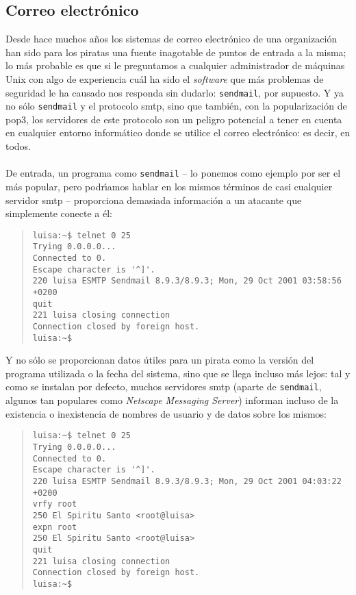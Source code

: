 \subsection{Correo electr\'onico}
Desde hace muchos a\~nos los sistemas de correo electr\'onico de una 
organizaci\'on han sido para los piratas una fuente inagotable de puntos de 
entrada a la misma; lo m\'as probable es que si le preguntamos a cualquier 
administrador de m\'aquinas Unix con algo de experiencia cu\'al ha sido el {\it 
software} que m\'as problemas de seguridad le ha causado nos responda sin 
dudarlo: {\tt sendmail}, por supuesto. Y ya no s\'olo {\tt sendmail} y el 
protocolo {\sc smtp}, sino que tambi\'en, con la popularizaci\'on de {\sc 
pop3}, los servidores de este protocolo son un peligro potencial a tener en
cuenta en cualquier entorno inform\'atico donde se utilice el correo 
electr\'onico: es decir, en todos.\\
\\De entrada, un programa como {\tt sendmail} -- lo ponemos como ejemplo por 
ser el m\'as popular, pero podr\'{\i}amos hablar en los mismos t\'erminos de
casi cualquier servidor {\sc smtp} -- proporciona demasiada informaci\'on a un
atacante que simplemente conecte a \'el:
\begin{quote}
\begin{verbatim}
luisa:~$ telnet 0 25
Trying 0.0.0.0...
Connected to 0.
Escape character is '^]'.
220 luisa ESMTP Sendmail 8.9.3/8.9.3; Mon, 29 Oct 2001 03:58:56 +0200
quit
221 luisa closing connection
Connection closed by foreign host.
luisa:~$ 
\end{verbatim}
\end{quote}
Y no s\'olo se proporcionan datos \'utiles para un pirata como la versi\'on del 
programa utilizada o la fecha del sistema, sino que se llega incluso m\'as 
lejos: tal y como se instalan por defecto, muchos servidores {\sc smtp} (aparte
de {\tt sendmail}, algunos tan populares como {\it Netscape Messaging Server})
informan incluso de la existencia o inexistencia de nombres de usuario y de 
datos sobre los mismos:
\begin{quote}
\begin{verbatim}
luisa:~$ telnet 0 25
Trying 0.0.0.0...
Connected to 0.
Escape character is '^]'.
220 luisa ESMTP Sendmail 8.9.3/8.9.3; Mon, 29 Oct 2001 04:03:22 +0200
vrfy root
250 El Spiritu Santo <root@luisa>
expn root
250 El Spiritu Santo <root@luisa>
quit
221 luisa closing connection
Connection closed by foreign host.
luisa:~$ 
\end{verbatim}
\end{quote}
